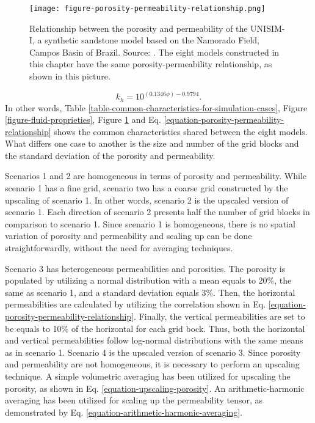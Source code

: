 %
\begin{figure}[H]
	\centering
	\texttt{[image: figure-porosity-permeability-relationship.png]}
	\caption{Relationship between the porosity and permeability of the UNISIM-I, a synthetic sandstone model based on the Namorado Field, Campos Basin of Brazil. Source: \cite{Avansi2015}. The eight models constructed in this chapter have the same porosity-permeability relationship, as shown in this picture.}
	\label{figure-porosity-permeability-relationship}
\end{figure}
%
\begin{equation}\label{equation-porosity-permeability-relationship}
	k_h = 10^{(0.1346\phi)-0.9794}.
\end{equation}
%
In other words, Table \ref{table-common-characteristics-for-simulation-cases}, Figure \ref{figure-fluid-proprieties}, Figure \ref{figure-porosity-permeability-relationship} and Eq. \ref{equation-porosity-permeability-relationship} shows the common characteristics shared between the eight models.
%
What differs one case to another is the size and number of the grid blocks and the standard deviation of the porosity and permeability. 

Scenarios 1 and 2 are homogeneous in terms of porosity and permeability.
%
While scenario 1 has a fine grid, scenario two has a coarse grid constructed by the upscaling of scenario 1.
%
In other words, scenario 2 is the upscaled version of scenario 1.
%
Each direction of scenario 2 presents half the number of grid blocks in comparison to scenario 1.
%
Since scenario 1 is homogeneous, there is no spatial variation of porosity and permeability and scaling up can be done straightforwardly, without the need for averaging techniques.

Scenario 3 has heterogeneous permeabilities and porosities.
%
The porosity is populated by utilizing a normal distribution with a mean equals to 20\%, the same as scenario 1, and a standard deviation equals 3\%.
%
Then, the horizontal permeabilities are calculated by utilizing the correlation shown in Eq. \ref{equation-porosity-permeability-relationship}.
%
Finally, the vertical permeabilities are set to be equals to 10\% of the horizontal for each grid bock.
%
Thus, both the horizontal and vertical permeabilities follow log-normal distributions with the same means as in scenario 1.
%
Scenario 4 is the upscaled version of scenario 3.
%
Since porosity and permeability are not homogeneous, it is necessary to perform an upscaling technique.
%
A simple volumetric averaging has been utilized for upscaling the porosity, as shown in Eq. \ref{equation-upscaling-porosity}.
%
An arithmetic-harmonic averaging has been utilized for scaling up the permeability tensor, as demonstrated by Eq. \ref{equation-arithmetic-harmonic-averaging}.


